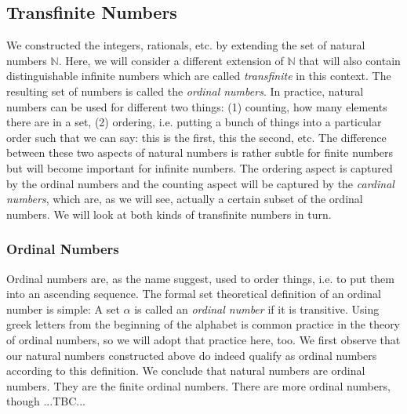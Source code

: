 



\subsection{Transfinite Numbers}
We constructed the integers, rationals, etc. by extending the set of natural numbers $\mathbb{N}$. Here, we will consider a different extension of $\mathbb{N}$ that will also contain distinguishable infinite numbers which are called \emph{transfinite} in this context. The resulting set of numbers is called the \emph{ordinal numbers}. In practice, natural numbers can be used for different two things: (1) counting, how many elements there are in a set, (2) ordering, i.e. putting a bunch of things into a particular order such that we can say: this is the first, this the second, etc. The difference between these two aspects of natural numbers is rather subtle for finite numbers but will become important for infinite numbers. The ordering aspect is captured by the ordinal numbers and the counting aspect will be captured by the \emph{cardinal numbers}, which are, as we will see, actually a certain subset of the ordinal numbers. We will look at both kinds of transfinite numbers in turn.





\subsubsection{Ordinal Numbers}
Ordinal numbers are, as the name suggest, used to order things, i.e. to put them into an ascending sequence. The formal set theoretical definition of an ordinal number is simple: A set $\alpha$ is called an \emph{ordinal number} if it is transitive. Using greek letters from the beginning of the alphabet is common practice in the theory of ordinal numbers, so we will adopt that practice here, too. We first observe that our natural numbers constructed above do indeed qualify as ordinal numbers according to this definition. We conclude that natural numbers are ordinal numbers. They are the finite ordinal numbers. There are more ordinal numbers, though ...TBC...


